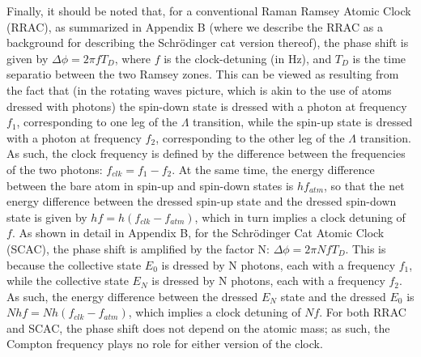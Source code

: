 \documentclass[aps,pra,letterpaper,superscriptaddress,showpacs,amsmath,floats,twocolumn]{revtex4-1}
\begin{document}
Finally, it should be noted that, for a conventional Raman Ramsey Atomic Clock (RRAC), as summarized in Appendix B (where we describe the RRAC as a background for describing the Schr\"odinger cat version thereof), the phase shift is given by $\Delta \phi=2\pi f T_{D}$, where $f$ is the clock-detuning (in Hz), and $T_{D}$ is the time separatio between the two Ramsey zones. This can be viewed as resulting from the fact that (in the rotating waves picture, which is akin to the use of atoms dressed with photons) the spin-down state is dressed with a photon at frequency $f_{1}$, corresponding to one leg of the $\Lambda$ transition, while the spin-up state is dressed with a photon at frequency $f_{2}$, corresponding to the other leg of the $\Lambda$ transition. As such, the clock frequency is defined by the difference between the frequencies of the two photons: $f_{clk}=f_{1}-f_{2}$. At the same time, the energy difference between the bare atom in spin-up and spin-down states is $h f_{atm}$, so that the net energy difference between the dressed spin-up state and the dressed spin-down state is given by $h f=h (f_{clk}-f_{atm})$, which in turn implies a clock detuning of $f$. As shown in detail in Appendix B, for the Schr\"odinger Cat Atomic Clock (SCAC), the phase shift is amplified by the factor N: $\Delta \phi=2\pi N f T_{D}$. This is because the collective state $E_{0}$ is dressed by N photons, each with a frequency $f_{1}$, while the collective state $E_{N}$ is dressed by N photons, each with a frequency $f_{2}$. As such, the energy difference between the dressed $E_{N}$ state and the dressed $E_{0}$ is $N h f=N h (f_{clk}-f_{atm})$, which implies a clock detuning of $N f$. For both RRAC and SCAC, the phase shift does not depend on the atomic mass; as such, the Compton frequency plays no role for either version of the clock. 


\end{document}
